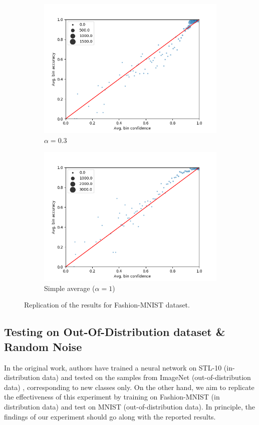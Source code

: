 \begin{figure}[h]
\begin{subfigure}[b]{0.31\textwidth}
         \centering
         \noindent\includegraphics[width=\textwidth]{images/fmnist/scatterplot_0-3.png}
         \caption{$\alpha=0.3$}
     \end{subfigure}
     \begin{subfigure}[b]{0.31\textwidth}
         \centering
         \noindent\includegraphics[width=\textwidth]{images/fmnist/scatterplot_1.png}
         \caption{Simple average ($\alpha=1$)}
     \end{subfigure}
        \caption{Replication of the results for Fashion-MNIST dataset.}
        \label{fig:fmnist}
\end{figure}

\subsection{Testing on Out-Of-Distribution dataset \& Random Noise}
\label{sec:ood}
In the original work, authors have trained a neural network on STL-10 (in-distribution data) and tested on the samples from ImageNet (out-of-distribution data) \cite{imagenet_cvpr09}, corresponding to new classes only. On the other hand, we aim to replicate the effectiveness of this experiment by training on Fashion-MNIST (in distribution data) and test on MNIST (out-of-distribution data). In principle, the findings of our experiment should go along with the reported results.

